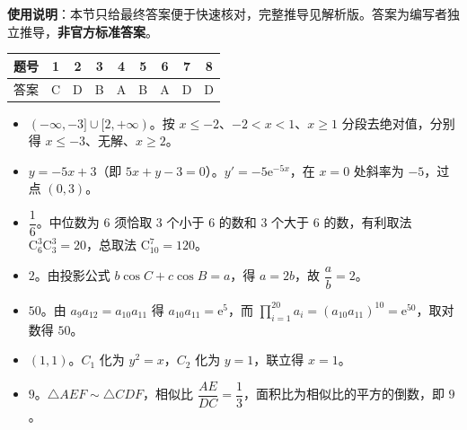 
\begin{gknotice}
\textbf{使用说明}：本节只给最终答案便于快速核对，完整推导见解析版。答案为编写者独立推导，\textbf{非官方标准答案}。
\end{gknotice}

\begin{center}\begin{tabular}{ccccccccc}
\toprule
题号 & 1 & 2 & 3 & 4 & 5 & 6 & 7 & 8 \\
\midrule
答案 & C & D & B & A & B & A & D & D \\
\bottomrule
\end{tabular}\end{center}

\begin{itemize}[leftmargin=2.6em]
  \item[\textbf{9.}] $(-\infty,-3]\cup[2,+\infty)$。按 $x\leqslant-2$、$-2<x<1$、$x\geqslant1$ 分段去绝对值，分别得 $x\leqslant-3$、无解、$x\geqslant2$。
  \item[\textbf{10.}] $y=-5x+3$（即 $5x+y-3=0$）。$y'=-5\mathrm e^{-5x}$，在 $x=0$ 处斜率为 $-5$，过点 $(0,3)$。
  \item[\textbf{11.}] $\dfrac16$。中位数为 $6$ 须恰取 $3$ 个小于 $6$ 的数和 $3$ 个大于 $6$ 的数，有利取法 $\mathrm C_6^3\mathrm C_3^3=20$，总取法 $\mathrm C_{10}^7=120$。
  \item[\textbf{12.}] $2$。由投影公式 $b\cos C+c\cos B=a$，得 $a=2b$，故 $\dfrac ab=2$。
  \item[\textbf{13.}] $50$。由 $a_9a_{12}=a_{10}a_{11}$ 得 $a_{10}a_{11}=\mathrm e^5$，而 $\prod_{i=1}^{20}a_i=(a_{10}a_{11})^{10}=\mathrm e^{50}$，取对数得 $50$。
  \item[\textbf{14.}] $(1,1)$。$C_1$ 化为 $y^2=x$，$C_2$ 化为 $y=1$，联立得 $x=1$。
  \item[\textbf{15.}] $9$。$\triangle AEF\sim\triangle CDF$，相似比 $\dfrac{AE}{DC}=\dfrac13$，面积比为相似比的平方的倒数，即 $9$。
\end{itemize}

